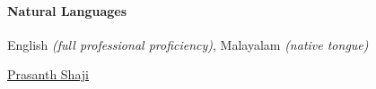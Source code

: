 \documentclass{scrartcl}
\begin{document}
		\paragraph{Natural Languages}{English \textit{(full professional proficiency)}, Malayalam \textit{(native tongue)}}


	\vfill

	\begin{center}
		 \href{https://www.linkedin.com/in/prasanth-shaji-65338b92/}{Prasanth Shaji}
	\end{center}
\end{document}
